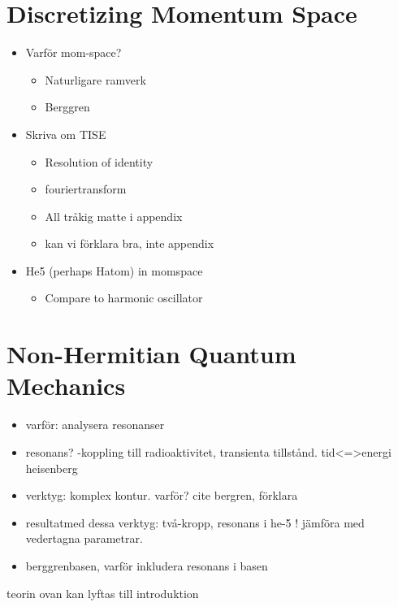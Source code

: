 \documentclass[12pt,a4paper]{report}
\begin{document}


\chapter{Discretizing Momentum Space} %
\label{cha:discretizing_momentum_space}

\begin{itemize}
  \item Varför mom-space? 
  \begin{itemize}
    \item Naturligare ramverk
    \item Berggren
  \end{itemize}
  \item Skriva om TISE
  \begin{itemize}
    \item Resolution of identity
    \item fouriertransform
    \item All tråkig matte i appendix
    \item kan vi förklara bra, inte appendix
  \end{itemize}
  \item He5 (perhaps Hatom) in momspace
  \begin{itemize}
    \item Compare to harmonic oscillator
  \end{itemize}
\end{itemize}



\chapter{Non-Hermitian Quantum Mechanics} %
\label{cha:non_hermitian_quantum_mechanics}

\begin{itemize}
  \item varför: analysera resonanser
  \item resonans? -koppling till radioaktivitet, transienta tillstånd. tid<=>energi heisenberg
  \item verktyg: komplex kontur. varför? cite bergren, förklara 
  \item resultatmed dessa verktyg: två-kropp, resonans i he-5 ! jämföra med vedertagna parametrar. 
  \item berggrenbasen, varför inkludera resonans i basen
\end{itemize}
teorin ovan kan lyftas till introduktion
\end{document}
